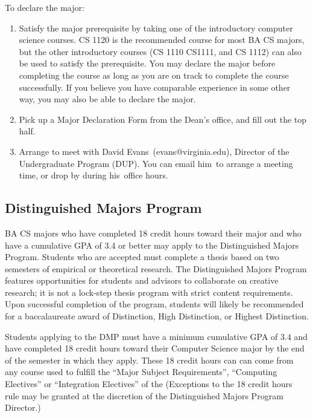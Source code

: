 \documentclass[10pt,letter]{book}
\makeatletter
\newenvironment{numlist}{
\begin{enumerate}
\setlength{\itemsep}{0pt}
\setlength{\parskip}{0pt}}
{\end{enumerate}}
\newcommand{\badup}{David Evans}
\newcommand{\badupemail}{evans@virginia.edu}
\newcommand{\baduppronoun}{his\ } %
\newcommand{\baduppronountwo}{him\ } %
\makeatother
\begin{document}
To declare the major:

\begin{numlist}

\item Satisfy the major prerequisite by taking one of the introductory
  computer science courses. CS 1120 is the recommended course
  for most BA CS majors, but the other introductory courses (CS 1110
  CS1111, and CS 1112) can also be used to satisfy the
  prerequisite. You may declare the major before completing the course
  as long as you are on track to complete the course successfully. If
  you believe you have comparable experience in some other way, you
  may also be able to declare the major.

\item Pick up a Major Declaration Form from the Dean's office, and
  fill out the top half.

\item Arrange to meet with \badup\ (\badupemail), Director of the
  Undergraduate Program (DUP). You can email \baduppronountwo to arrange
  a meeting time, or drop by during \baduppronoun office hours.

\end{numlist}


\subsection{Distinguished Majors Program}


BA CS majors who have completed 18 credit hours toward their major
and who have a cumulative GPA of 3.4 or better may apply to the
Distinguished Majors Program. Students who are accepted must complete
a thesis based on two semesters of empirical or theoretical
research. The Distinguished Majors Program features opportunities for
students and advisors to collaborate on creative research; it is not a
lock-step thesis program with strict content requirements. Upon
successful completion of the program, students will likely be
recommended for a baccalaureate award of Distinction, High
Distinction, or Highest Distinction.

Students applying to the DMP must have a minimum cumulative GPA of 3.4
and have completed 18 credit hours toward their Computer Science
major by the end of the semester in which they apply. These 18 credit
hours can can come from any course used to fulfill the ``Major Subject
Requirements'', ``Computing Electives'' or ``Integration Electives''
of the 
(Exceptions to the 18 credit hours rule may be granted at the
discretion of the Distinguished Majors Program Director.)
\end{document}

